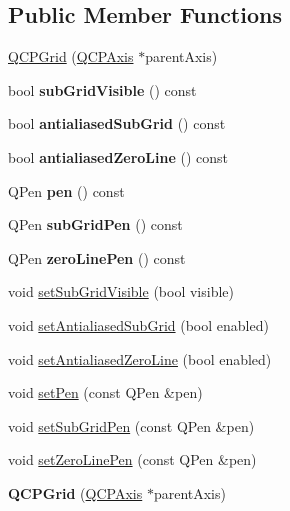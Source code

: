 \subsection*{Public Member Functions}
\begin{DoxyCompactItemize}
\item 
\hyperlink{class_q_c_p_grid_acd1cdd2909625388a13048b698494a17}{Q\+C\+P\+Grid} (\hyperlink{class_q_c_p_axis}{Q\+C\+P\+Axis} $\ast$parent\+Axis)
\item 
bool {\bfseries sub\+Grid\+Visible} () const \hypertarget{class_q_c_p_grid_a0a8963e384d53cd77cbab7df96147458}{}\label{class_q_c_p_grid_a0a8963e384d53cd77cbab7df96147458}

\item 
bool {\bfseries antialiased\+Sub\+Grid} () const \hypertarget{class_q_c_p_grid_abfa6c638a05b45b2ed31b680fc9b31fc}{}\label{class_q_c_p_grid_abfa6c638a05b45b2ed31b680fc9b31fc}

\item 
bool {\bfseries antialiased\+Zero\+Line} () const \hypertarget{class_q_c_p_grid_a4dfbc1cee989d8cae1434b765ab2a13b}{}\label{class_q_c_p_grid_a4dfbc1cee989d8cae1434b765ab2a13b}

\item 
Q\+Pen {\bfseries pen} () const \hypertarget{class_q_c_p_grid_aca20b67548e3ae31fd02e6398ffd6cb9}{}\label{class_q_c_p_grid_aca20b67548e3ae31fd02e6398ffd6cb9}

\item 
Q\+Pen {\bfseries sub\+Grid\+Pen} () const \hypertarget{class_q_c_p_grid_ac698f8c6864b1d8f0e2af97ca4b39cc6}{}\label{class_q_c_p_grid_ac698f8c6864b1d8f0e2af97ca4b39cc6}

\item 
Q\+Pen {\bfseries zero\+Line\+Pen} () const \hypertarget{class_q_c_p_grid_a06ea986b651860446e1224d2097259b9}{}\label{class_q_c_p_grid_a06ea986b651860446e1224d2097259b9}

\item 
void \hyperlink{class_q_c_p_grid_ad4ad6bf714ec45e08845456355a1b700}{set\+Sub\+Grid\+Visible} (bool visible)
\item 
void \hyperlink{class_q_c_p_grid_a5692310ba183721a413d60951407d114}{set\+Antialiased\+Sub\+Grid} (bool enabled)
\item 
void \hyperlink{class_q_c_p_grid_a3cc6d54647393ee71afb6da56af07aa4}{set\+Antialiased\+Zero\+Line} (bool enabled)
\item 
void \hyperlink{class_q_c_p_grid_aa05ab9816ffb440908171e45e833b593}{set\+Pen} (const Q\+Pen \&pen)
\item 
void \hyperlink{class_q_c_p_grid_a9edd3593f384d1f0b0202a39cef4453d}{set\+Sub\+Grid\+Pen} (const Q\+Pen \&pen)
\item 
void \hyperlink{class_q_c_p_grid_a209f40fdb252397b418b82d3494d8ea0}{set\+Zero\+Line\+Pen} (const Q\+Pen \&pen)
\item 
{\bfseries Q\+C\+P\+Grid} (\hyperlink{class_q_c_p_axis}{Q\+C\+P\+Axis} $\ast$parent\+Axis)\hypertarget{class_q_c_p_grid_acd1cdd2909625388a13048b698494a17}{}\label{class_q_c_p_grid_acd1cdd2909625388a13048b698494a17}


\end{DoxyCompactItemize}

